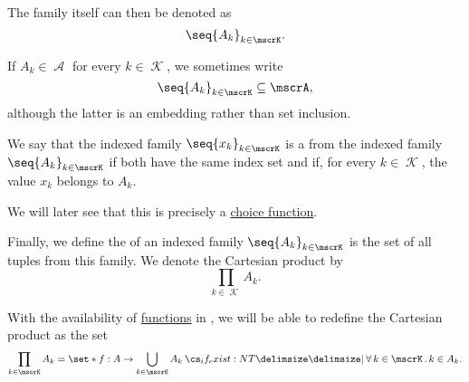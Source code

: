 \begin{definition}
\begin{thmenum}
    The family itself can then be denoted as
    \begin{equation*}
      \seq{ A_k }_{k \in \mscrK}.
    \end{equation*}

    If \( A_k \in \mscrA \) for every \( k \in \mscrK \), we sometimes write
    \begin{equation*}
      \seq{ A_k }_{k \in \mscrK} \subseteq \mscrA,
    \end{equation*}
    although the latter is an embedding rather than set inclusion.

    \mimprovised We say that the indexed family \( \seq{ x_k }_{k \in \mscrK} \) is a  from the indexed family \( \seq{ A_k }_{k \in \mscrK} \) if both have the same index set and if, for every \( k \in \mscrK \), the value \( x_k \) belongs to \( A_k \).

    We will later see that this is precisely a \hyperref[def:choice_function]{choice function}.

     Finally, we define the  of an indexed family \( \seq{ A_k }_{k \in \mscrK} \) is the set of all tuples from this family. We denote the Cartesian product by
    \begin{equation*}
      \prod_{k \in \mscrK} A_k.
    \end{equation*}

    With the availability of \hyperref[def:function]{functions} in , we will be able to redefine the Cartesian product as the set
    \begin{equation*}
      \prod_{k \in \mscrK} A_k = \set*{ f: A \to \bigcup_{k \in \mscrK} A_k \given* \qforall {k \in \mscrK} k \in A_k }.
    \end{equation*}
  \end{thmenum}
\end{definition}

